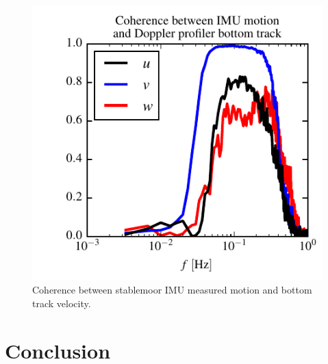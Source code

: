 \documentclass[twocol]{ametsoc}
\begin{document}
\begin{figure}[t]
  \centering
  \includegraphics{BT_IMU_Coherence02}
  \caption{Coherence between stablemoor IMU measured motion and bottom track velocity.}
  \label{fig:SM_coh}
\end{figure}

\section{Conclusion}





\acknowledgments


\clearpage %

\appendix






\end{document}
